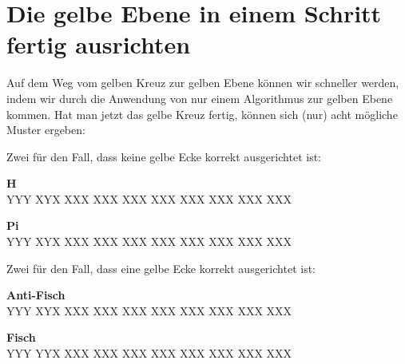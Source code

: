 \section{Die gelbe Ebene in einem Schritt fertig ausrichten}
Auf dem Weg vom gelben Kreuz zur gelben Ebene können wir schneller werden, indem wir durch die Anwendung von nur einem Algorithmus zur gelben Ebene kommen.
Hat man jetzt das gelbe Kreuz fertig, können sich (nur) acht mögliche Muster ergeben:

Zwei für den Fall, dass keine gelbe Ecke korrekt ausgerichtet ist:
\parbox{0.5\linewidth}{
	\begin{center}
		\textbf{H}\\[1ex]
		\RubikCubeGreyAll%
		{Y}{Y}{Y}
		{X}{Y}{X}%
			 {X}{X}{X}
			 {X}{X}{X}%
			 {X}{X}{X}
			 {X}{X}{X}%
			{X}{X}{X}
			{X}{X}{X}%
			{X}{X}{X}
			{X}{X}{X}%
	\end{center}
}\parbox{0.5\linewidth}{
	\begin{center}
		\textbf{Pi}\\[1ex]
		\RubikCubeGreyAll%
		{Y}{Y}{Y}
		{X}{Y}{X}%
			 {X}{X}{X}
			 {X}{X}{X}%
			 {X}{X}{X}
			 {X}{X}{X}%
			{X}{X}{X}
			{X}{X}{X}%
			{X}{X}{X}
			{X}{X}{X}%
	\end{center}
}

Zwei für den Fall, dass eine gelbe Ecke korrekt ausgerichtet ist:
\parbox{0.5\linewidth}{
	\begin{center}
		\textbf{Anti-Fisch} \\[1ex]
		\RubikCubeGreyAll%
					{Y}{Y}{Y}
					{X}{Y}{X}%
			 {X}{X}{X}
			 {X}{X}{X}%
			 {X}{X}{X}
			 {X}{X}{X}%
			{X}{X}{X}
			{X}{X}{X}%
			{X}{X}{X}
			{X}{X}{X}%
	\end{center}
}\parbox{0.5\linewidth}{
	\begin{center}
		\textbf{Fisch} \\[1ex]
		\RubikCubeGreyAll%
					{Y}{Y}{Y}
					{Y}{Y}{X}%
			 {X}{X}{X}
			 {X}{X}{X}%
			 {X}{X}{X}
			 {X}{X}{X}%
			{X}{X}{X}
			{X}{X}{X}%
			{X}{X}{X}
			{X}{X}{X}%
	\end{center}
}


